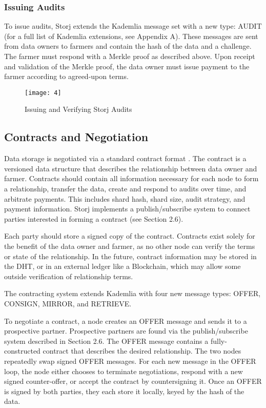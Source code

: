 \documentclass[a4paper,10pt]{article}
\begin{document}
\subsubsection{Issuing Audits}
To issue audits, Storj extends the Kademlia message set with a new type: AUDIT (for a full list of Kademlia extensions, see Appendix A). These messages are sent from data owners to farmers and contain the hash of the data and a challenge. The farmer must respond with a Merkle proof as described above. Upon receipt and validation of the Merkle proof, the data owner must issue payment to the farmer according to agreed-upon terms.

\begin{figure}[hbt]
\centering
\texttt{[image: 4]}
\caption{Issuing and Verifying Storj Audits}
\end{figure}

\subsection{Contracts and Negotiation}
Data storage is negotiated via a standard contract format \cite{7}. The contract is a versioned data structure that describes the relationship between data owner and farmer. Contracts should contain all information necessary for each node to form a relationship, transfer the data, create and respond to audits over time, and arbitrate payments. This includes shard hash, shard size, audit strategy, and payment information. Storj implements a publish/subscribe system to connect parties interested in forming a contract (see Section 2.6).

Each party should store a signed copy of the contract. Contracts exist solely for the benefit of the data owner and farmer, as no other node can verify the terms or state of the relationship. In the future, contract information may be stored in the DHT, or in an external ledger like a Blockchain, which may allow some outside verification of relationship terms.

The contracting system extends Kademlia with four new message types: OFFER, CONSIGN, MIRROR, and RETRIEVE.

To negotiate a contract, a node creates an OFFER message and sends it to a prospective partner. Prospective partners are found via the publish/subscribe system described in Section 2.6. The OFFER message contains a fully-constructed contract that describes the desired relationship. The two nodes repeatedly swap signed OFFER messages. For each new message in the OFFER loop, the node either chooses to terminate negotiations, respond with a new signed counter-offer, or accept the contract by countersigning it. Once an OFFER is signed by both parties, they each store it locally, keyed by the hash of the data.
\end{document}
